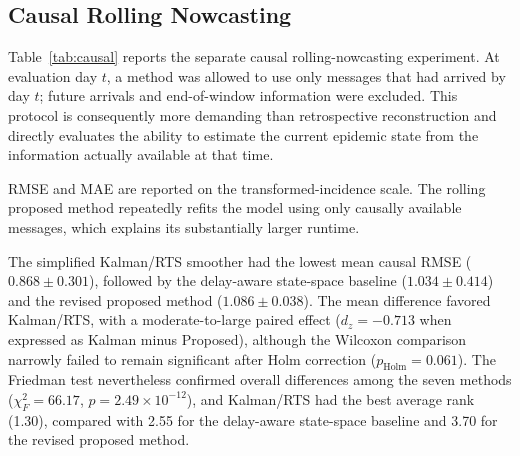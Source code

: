 \subsection{Causal Rolling Nowcasting}
\label{subsec:causal_results}

Table~\ref{tab:causal} reports the separate causal rolling-nowcasting experiment. At evaluation day $t$, a method was allowed to use only messages that had arrived by day $t$; future arrivals and end-of-window information were excluded. This protocol is consequently more demanding than retrospective reconstruction and directly evaluates the ability to estimate the current epidemic state from the information actually available at that time.

\begin{table}[!htbp]
\centering
\caption{Causal rolling nowcasting on the locked semi-real test interval over 20 paired corruption seeds.}
\label{tab:causal}
\small
{}
\begin{minipage}{0.98\textwidth}\footnotesize RMSE and MAE are reported on the transformed-incidence scale. The rolling proposed method repeatedly refits the model using only causally available messages, which explains its substantially larger runtime.\end{minipage}
\end{table}

The simplified Kalman/RTS smoother had the lowest mean causal RMSE ($0.868\pm0.301$), followed by the delay-aware state-space baseline ($1.034\pm0.414$) and the revised proposed method ($1.086\pm0.038$). The mean difference favored Kalman/RTS, with a moderate-to-large paired effect ($d_z=-0.713$ when expressed as Kalman minus Proposed), although the Wilcoxon comparison narrowly failed to remain significant after Holm correction ($p_{\mathrm{Holm}}=0.061$). The Friedman test nevertheless confirmed overall differences among the seven methods ($\chi^2_F=66.17$, $p=2.49\times10^{-12}$), and Kalman/RTS had the best average rank (1.30), compared with 2.55 for the delay-aware state-space baseline and 3.70 for the revised proposed method.

